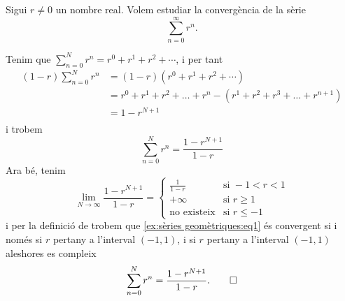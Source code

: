 \documentclass[../Apunts.tex]{subfiles}
\begin{document}
	\begin{example}
		\label{ex:sèries geomètriques}
		Sigui \(r\neq0\) un nombre real. Volem estudiar la convergència de la sèrie
		\begin{equation}
			\label{ex:sèries geomètriques:eq1}
			\sum_{n=0}^{\infty}r^{n}.
		\end{equation}
		\begin{solution}
			Tenim que \(\sum_{n=0}^{N}r^{n}=r^{0}+r^{1}+r^{2}+\cdots\), i per tant
			\begin{align*}
				(1-r)\sum_{n=0}^{N}r^{n}&=(1-r)(r^{0}+r^{1}+r^{2}+\cdots)\\
				&=r^{0}+r^{1}+r^{2}+\dots+r^{n}-(r^{1}+r^{2}+r^{3}+\dots+r^{n+1})\\
				&=1-r^{N+1}\\
			\end{align*}
			i trobem
			\begin{equation*}
				\sum_{n=0}^{N}r^{n}=\frac{1-r^{N+1}}{1-r}
			\end{equation*}
			Ara bé, tenim
			\[\lim_{N\to\infty}\frac{1-r^{N+1}}{1-r}=
			\begin{cases}
				\displaystyle \frac{1}{1-r} & \text{si }-1<r<1 \\
				+\infty & \text{si }r\geq1 \\
				\text{no existeix} & \text{si }r\leq-1 
			\end{cases}\]
			i per la definició de  trobem que \eqref{ex:sèries geomètriques:eq1} és convergent si i només si \(r\) pertany a l'interval \((-1,1)\), i si \(r\) pertany a l'interval \((-1,1)\) aleshores es compleix
			\begin{equation*}
				\sum_{n=0}^{N}r^{n}=\frac{1-r^{N+1}}{1-r}.\qedhere
			\end{equation*}
		\end{solution}
	\end{example}
\end{document}
